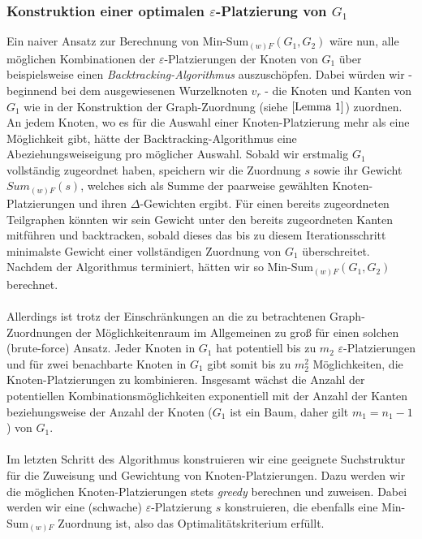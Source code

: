 \documentclass[a4paper, 12pt, twoside]{article}
\theoremstyle{Format1} %
\begin{document}
\subsubsection{Konstruktion einer optimalen $\varepsilon$-Platzierung von $G_1$}
Ein naiver Ansatz zur Berechnung von Min-Sum$_{(w)F}(G_1,G_2)$ wäre nun, alle möglichen Kombinationen der $\varepsilon$-Platzierungen der Knoten von $G_1$ über beispielsweise einen
\textit{Backtracking-Algorithmus} auszuschöpfen.
Dabei würden wir - beginnend bei dem ausgewiesenen Wurzelknoten $v_r$ - die Knoten und Kanten von $G_1$ wie in der Konstruktion der Graph-Zuordnung (siehe $\ref{Lemma 1}$) zuordnen.
An jedem Knoten, wo es für die Auswahl einer Knoten-Platzierung mehr als eine Möglichkeit gibt, hätte der Backtracking-Algorithmus eine Abeziehungsweiseigung pro möglicher Auswahl.
Sobald wir erstmalig $G_1$ vollständig zugeordnet haben, speichern wir die Zuordnung $s$ sowie ihr Gewicht $Sum_{(w)F}(s)$, welches sich als Summe der
paarweise gewählten Knoten-Platzierungen und ihren $\Delta$-Gewichten ergibt.
Für einen bereits zugeordneten Teilgraphen könnten wir sein Gewicht unter den bereits zugeordneten Kanten mitführen und backtracken, sobald dieses das bis zu diesem Iterationsschritt
minimalste Gewicht einer vollständigen Zuordnung von $G_1$ überschreitet. Nachdem der Algorithmus terminiert, hätten wir so Min-Sum$_{(w)F}(G_1,G_2)$ berechnet.
\\
\\
Allerdings ist trotz der Einschränkungen an die zu betrachtenen Graph-Zuordnungen der Möglichkeitenraum im Allgemeinen zu groß
für einen solchen (brute-force) Ansatz.
Jeder Knoten in $G_1$ hat potentiell bis zu $m_2$ $\varepsilon$-Platzierungen und für
zwei benachbarte Knoten in $G_1$ gibt somit bis zu $m_2^2$ Möglichkeiten, die Knoten-Platzierungen zu kombinieren.
Insgesamt wächst die Anzahl der potentiellen Kombinationsmöglichkeiten exponentiell mit der Anzahl der Kanten beziehungsweise der Anzahl der Knoten
($G_1$ ist ein Baum, daher gilt $m_1 = n_1-1$) von $G_1$.
\\
\\
Im letzten Schritt des Algorithmus konstruieren wir eine geeignete Suchstruktur für die Zuweisung und Gewichtung von Knoten-Platzierungen.
Dazu werden wir die möglichen Knoten-Platzierungen stets \textit{greedy} berechnen und zuweisen.
Dabei werden wir eine (schwache) $\varepsilon$-Platzierung $s$ konstruieren, die ebenfalls eine Min-Sum$_{(w)F}$ Zuordnung ist, also das Optimalitätskriterium erfüllt.
\\
\\
\end{document}
